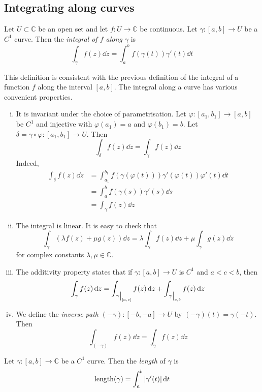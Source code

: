 \subsection{Integrating along curves}
\begin{definition}
	Let \( U \subset \mathbb C \) be an open set and let \( f \colon U \to \mathbb C \) be continuous.
	Let \( \gamma \colon [a,b] \to U \) be a \( C^1 \) curve.
	Then the \textit{integral of \( f \) along \( \gamma \)} is
	\[ \int_\gamma f(z) \dd{z} = \int_a^b f(\gamma(t)) \gamma'(t) \dd{t} \]
\end{definition}
This definition is consistent with the previous definition of the integral of a function \( f \) along the interval \( [a,b] \).
The integral along a curve has various convenient properties.
\begin{enumerate}[(i)]
	\item It is invariant under the choice of parametrisation.
		Let \( \varphi \colon [a_1, b_1] \to [a,b] \) be \( C^1 \) and injective with \( \varphi(a_1) = a \) and \( \varphi(b_1) = b \).
		Let \( \delta = \gamma \circ \varphi \colon [a_1, b_1] \to U \).
		Then
		\[ \int_\delta f(z) \dd{z} = \int_\gamma f(z) \dd{z} \]
		Indeed,
		\begin{align*}
			\int_\delta f(z) \dd{z} &= \int_{a_1}^{b_1} f(\gamma (\varphi(t))) \gamma'(\varphi(t)) \varphi'(t) \dd{t} \\
			&= \int_a^b f(\gamma(s)) \gamma'(s) \dd{s} \\
			&= \int_\gamma f(z) \dd{z}
		\end{align*}
	\item The integral is linear.
		It is easy to check that
		\[ \int_\gamma (\lambda f(z) + \mu g(z)) \dd{z} = \lambda \int_\gamma f(z) \dd{z} + \mu \int_\gamma g(z) \dd{z} \]
		for complex constants \( \lambda, \mu \in \mathbb C \).
	\item The additivity property states that if \( \gamma \colon[a,b] \to U \) is \( C^1 \) and \( a < c < b \), then
		\[ \int_\gamma f(z) \dd{z} = \int_{\eval{\gamma}_{[a,c]}} f(z) \dd{z} + \int_{\eval{\gamma}_{c,b}} f(z) \dd{z} \]
	\item We define the \textit{inverse path} \( (-\gamma) \colon [-b, -a] \to U \) by \( (-\gamma)(t) = \gamma(-t) \).
		Then
		\[ \int_{(-\gamma)} f(z) \dd{z} = \int_\gamma f(z) \dd{z} \]
\end{enumerate}
\begin{definition}
	Let \( \gamma \colon [a,b] \to \mathbb C \) be a \( C^1 \) curve.
	Then the \textit{length} of \( \gamma \) is
	\[ \mathrm{length}(\gamma) = \int_a^b \abs{\gamma'(t)} \dd{t} \]
\end{definition}
